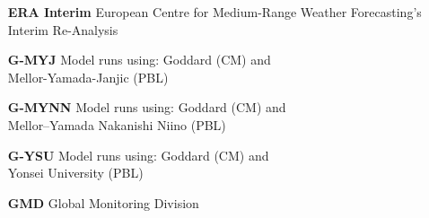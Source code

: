 \begin{enumerate}
    \item[\textbf{ERA Interim}] European Centre for Medium-Range Weather Forecasting’s Interim Re-Analysis
    \item[\textbf{G-MYJ}] Model runs using: Goddard (CM) and \\
    \hspace*{3.3cm} Mellor-Yamada-Janjic (PBL)
    \item[\textbf{G-MYNN}] Model runs using: Goddard (CM) and \\
    \hspace*{3.3cm} Mellor–Yamada Nakanishi Niino (PBL)
    \item[\textbf{G-YSU}] Model runs using: Goddard (CM) and \\
    \hspace*{3.3cm} Yonsei University (PBL)
    \item[\textbf{GMD}] Global Monitoring Division
    

\end{enumerate}

